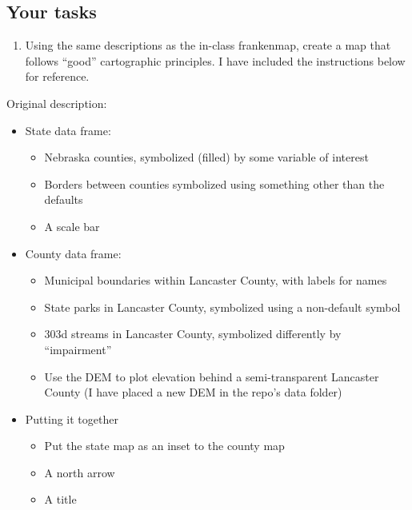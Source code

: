 \documentclass[]{article}
\providecommand{\tightlist}{%
  \setlength{\itemsep}{0pt}\setlength{\parskip}{0pt}}
\begin{document}
\hypertarget{your-tasks}{%
\subsection{Your tasks}\label{your-tasks}}

\begin{enumerate}
\def\labelenumi{\arabic{enumi}.}
\tightlist
\item
  Using the same descriptions as the in-class frankenmap, create a map
  that follows ``good'' cartographic principles. I have included the
  instructions below for reference.
\end{enumerate}

Original description:

\begin{itemize}
\tightlist
\item
  State data frame:

  \begin{itemize}
  \tightlist
  \item
    Nebraska counties, symbolized (filled) by some variable of interest
  \item
    Borders between counties symbolized using something other than the
    defaults
  \item
    A scale bar
  \end{itemize}
\item
  County data frame:

  \begin{itemize}
  \tightlist
  \item
    Municipal boundaries within Lancaster County, with labels for names
  \item
    State parks in Lancaster County, symbolized using a non-default
    symbol
  \item
    303d streams in Lancaster County, symbolized differently by
    ``impairment''
  \item
    Use the DEM to plot elevation behind a semi-transparent Lancaster
    County (I have placed a new DEM in the repo's data folder)
  \end{itemize}
\item
  Putting it together

  \begin{itemize}
  \tightlist
  \item
    Put the state map as an inset to the county map
  \item
    A north arrow
  \item
    A title
  \end{itemize}
\end{itemize}
\end{document}
